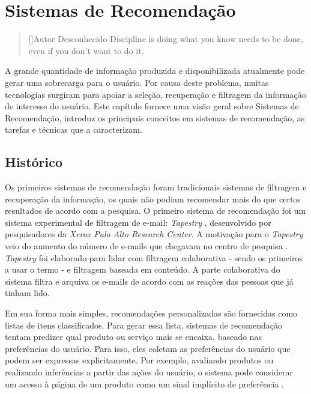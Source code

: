 \chapter{Sistemas de Recomendação}
\label{chp:recSys}

\begin{quotation}[]{Autor Desconhecido}
Discipline is doing what you know needs to be done, even if you don't want to do it.
\end{quotation}

A grande quantidade de informação produzida e disponibilizada atualmente pode gerar uma sobrecarga para o usuário. Por causa deste problema, muitas tecnologias surgiram para apoiar a seleção, recuperação e filtragem da informação de interesse do usuário. Este capítulo fornece uma visão geral sobre Sistemas de Recomendação, introduz os principais conceitos em sistemas de recomendação, as tarefas e técnicas que a caracterizam. \newline

\section{Histórico}
\label{sec:historyRecSys}

Os primeiros sistemas de recomendação foram tradicionais sistemas de filtragem e recuperação da informação, os quais não podiam recomendar mais do que certos resultados de acordo com a pesquisa. O primeiro sistema de recomendação foi um sistema experimental de filtragem de e-mail: \textit{Tapestry} \citep{Goldberg:1992:UCF:138859.138867}, desenvolvido por pesquisadores da \textit{Xerox Palo Alto Research Center}. A motivação para o \textit{Tapestry} veio do aumento do número de e-mails que chegavam no centro de pesquisa \citep{Resnick:1997:RS:245108.245121}. \textit{Tapestry} foi elaborado para lidar com filtragem colaborativa - sendo os primeiros a usar o termo - e filtragem baseada em conteúdo. A parte colaborativa do sistema filtra e arquiva os e-mails de acordo com as reações das pessoas que já tinham lido.

Em sua forma mais simples, recomendações personalizadas são fornecidas como listas de itens classificados. Para gerar essa lista, sistemas de recomendação tentam predizer qual produto ou serviço mais se encaixa, baseado nas preferências do usuário. Para isso, eles coletam as preferências do usuário que podem ser expressas explicitamente. Por exemplo, avaliando produtos ou realizando inferências a partir das ações do usuário, o sistema pode considerar um acesso à página de um produto como um sinal implícito de preferência \citep{Ricci:2010:RSH:1941884}.

